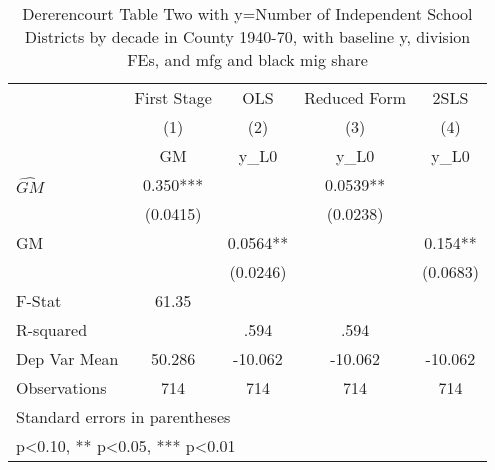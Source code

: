 \begin{table}[htbp]\centering
\def\sym#1{\ifmmode^{#1}\else\(^{#1}\)\fi}
\caption{Dererencourt Table Two with y=Number of Independent School Districts by decade in County 1940-70, with baseline y, division FEs, and mfg and black mig share}
\begin{tabular}{l*{4}{c}}
\toprule
                    & First Stage   &         OLS   &Reduced Form   &        2SLS   \\
                    &\multicolumn{1}{c}{(1)}&\multicolumn{1}{c}{(2)}&\multicolumn{1}{c}{(3)}&\multicolumn{1}{c}{(4)}\\
                    &\multicolumn{1}{c}{GM}&\multicolumn{1}{c}{y\_L0}&\multicolumn{1}{c}{y\_L0}&\multicolumn{1}{c}{y\_L0}\\
\midrule
$\hat{GM}$          &       0.350***&               &      0.0539** &               \\
                    &    (0.0415)   &               &    (0.0238)   &               \\
\addlinespace
GM                  &               &      0.0564** &               &       0.154** \\
                    &               &    (0.0246)   &               &    (0.0683)   \\
\midrule
F-Stat              &       61.35   &               &               &               \\
R-squared           &               &        .594   &        .594   &               \\
Dep Var Mean        &      50.286   &     -10.062   &     -10.062   &     -10.062   \\
Observations        &         714   &         714   &         714   &         714   \\
\bottomrule
\multicolumn{5}{l}{\footnotesize Standard errors in parentheses}\\
\multicolumn{5}{l}{\footnotesize * p<0.10, ** p<0.05, *** p<0.01}\\
\end{tabular}
\end{table}
